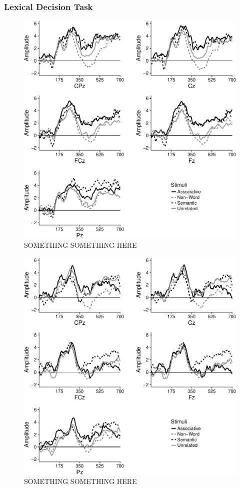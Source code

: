 \documentclass[english,man]{apa6}
\theoremstyle{definition}
\theoremstyle{definition}
\theoremstyle{definition}
\theoremstyle{remark}
\begin{document}
\subsubsection{Lexical Decision Task}\label{lexical-decision-task}

\begin{figure}
\centering
\includegraphics{BrainPaper_files/figure-latex/graph-LDT-1.pdf}
\caption{\label{fig:graph-LDT}SOMETHING SOMETHING HERE}
\end{figure}

\begin{figure}
\centering
\includegraphics{BrainPaper_files/figure-latex/graph-LST-1.pdf}
\caption{\label{fig:graph-LST}SOMETHING SOMETHING HERE}
\end{figure}
\end{document}
